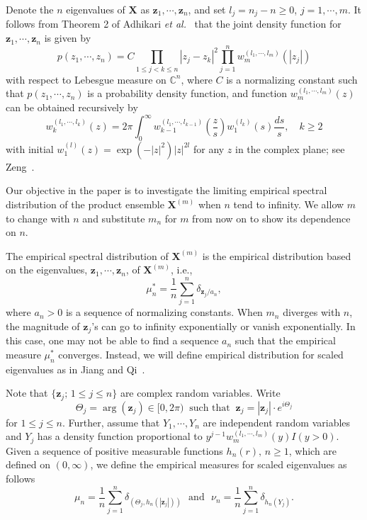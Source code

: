 \documentclass[11pt]{article}
\numberwithin{equation}{section}
\begin{document}
Denote the $n$ eigenvalues of $\mathbf{X}$ as $\mathbf{z}_{1},
\cdots, \mathbf{z}_{n}$, and set $l_{j}=n_j-n\geq 0$, $j=1, \cdots,
m$. It follows from Theorem 2 of Adhikari {\it et
al.}~\cite{ARRS2016} that the joint density function for
$\mathbf{z}_{1}, \cdots, \mathbf{z}_{n}$ is given by
\begin{equation}\label{model}
 p(z_{1}, \cdots,
z_{n})=C \prod_{1 \leq j<k \leq n}\left|z_{j}-z_{k}\right|^{2}
\prod_{j=1}^{n} w_{m}^{\left(l_{1}, \cdots,
l_{m}\right)}\left(\left|z_{j}\right|\right)
\end{equation}
with respect to Lebesgue measure on $\mathbb{C}^{n}$, where $C$ is a
normalizing constant such that $p(z_{1}, \cdots, z_{n})$ is a
probability density function, and function $w_{m}^{\left(l_{1},
\cdots, l_{m}\right)}(z)$ can be obtained recursively by
\[
w_{k}^{\left(l_{1}, \cdots, l_{k}\right)}(z)=2 \pi \int_{0}^{\infty}
w_{k-1}^{\left(l_{1}, \cdots,
l_{k-1}\right)}\left(\frac{z}{s}\right)
w_{1}^{\left(l_{k}\right)}(s) \frac{d s}{s}, \quad k \geq 2
\]
with initial $w_{1}^{(l)}(z)=\exp \left(-|z|^{2}\right)|z|^{2 l}$
for any $z$ in the complex plane; see Zeng~\cite{Zeng2016}.


Our objective in the paper is to investigate the limiting empirical
spectral distribution of the product ensemble $\mathbf{X}^{(m)}$
when $n$ tend to infinity. We allow $m$ to change with $n$ and
substitute $m_n$ for $m$ from now on to show its dependence on $n$.


The empirical spectral distribution of $\mathbf{X}^{(m)}$ is the
empirical distribution based on the eigenvalues, $\mathbf{z}_{1},
\cdots, \mathbf{z}_{n}$, of $\mathbf{X}^{(m)}$, i.e.,
\begin{equation}\label{mu*}
\mu_n^*=\frac1n\sum^n_{j=1}\delta_{\mathbf{z}_j/a_n},
\end{equation}
where $a_n>0$ is a sequence of normalizing constants.  When $m_n$
diverges with $n$, the magnitude of $\mathbf{z}_j$'s can go to
infinity exponentially or vanish exponentially. In this case, one
may not be able to find a sequence $a_n$ such that the empirical
measure $\mu_n^*$ converges. Instead, we will define empirical
distribution for scaled eigenvalues as in Jiang and
Qi~\cite{JiangQi2019}.


Note that $\{\mathbf{z}_j;\, 1\leq j \leq n\}$ are complex random
variables. Write
 \begin{equation}\label{argument}
\Theta_j=\arg(\mathbf{z}_j)\in [0, 2\pi)~\mbox{ such that }
~\mathbf{z}_j=|\mathbf{z}_j|\cdot e^{i\Theta_j}
\end{equation}
 for $1\le j\le n$. Further, assume that  $Y_1, \cdots, Y_n$ are independent
random variables and $Y_j$ has a density function proportional to
$y^{j-1}w_{m}^{(l_{1}, \cdots, l_{m})}(y)I(y>0)$. Given a sequence
of positive measurable functions $h_n(r), \, n\geq 1$, which are
defined on $(0,\infty)$, we define the empirical measures for scaled
eigenvalues as follows
\begin{equation}\label{mun}
\mu_n=\frac{1}{n}\sum^n_{j=1}\delta_{(\Theta_j,
h_n(|\mathbf{z}_j|))}~~~\mbox{and}~~~
\nu_n=\frac{1}{n}\sum^n_{j=1}\delta_{h_n(Y_j)}.
\end{equation}
\end{document}
